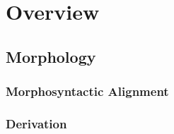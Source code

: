 \chapter{Overview}
	\section{Morphology}
		\subsection{Morphosyntactic Alignment}
		\subsection{Derivation}
